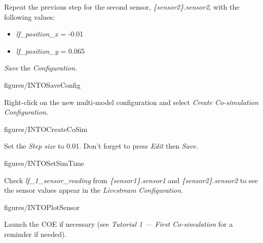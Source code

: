 \documentclass[11pt,a4paper]{../tutorial}
\begin{document}
\begin{instructions}
\item Repeat the previous step for the second sensor, \emph{\{sensor2\}.sensor2}, with the following values:

    \begin{itemize}
        \item \emph{lf\_position\_x} = -0.01
        \item \emph{lf\_position\_y} = 0.065
    \end{itemize}

\item \emph{Save} the \emph{Configuration}.

    \begin{annotation}[width=0.85\linewidth,trim=0 0 0 250,clip]{figures/INTOSaveConfig}
    \end{annotation}

\item Right-click on the new multi-model configuration and select \emph{Create Co-simulation Configuration}.

    \begin{annotation}[width=0.85\linewidth,trim=0 120 0 130,clip]{figures/INTOCreateCoSim}
    \end{annotation}

\item Set the \emph{Step size} to 0.01. Don't forget to press \emph{Edit} then \emph{Save}.

    \begin{annotation}[width=0.85\linewidth,trim=0 0 0 0,clip]{figures/INTOSetSimTime}
    \end{annotation}

\item Check \emph{lf\_1\_sensor\_reading} from \emph{\{sensor1\}.sensor1} and \emph{\{sensor2\}.sensor2} to see the sensor values appear in the \emph{Live\-stream Configuration}.

    \begin{annotation}[width=0.85\linewidth,trim=0 230 0 250,clip]{figures/INTOPlotSensor}
    \end{annotation}

\item Launch the COE if necessary (see \emph{Tutorial 1 --- First Co-simulation} for a reminder if needed).


\end{instructions}
\end{document}
